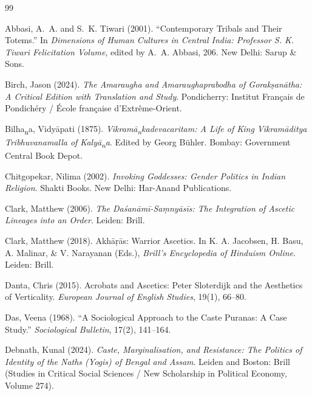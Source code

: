 \documentclass[11pt,twoside,letterpaper]{article}
\begin{document}
\begin{thebibliography}{99}

Abbasi, A.~A. and S.~K. Tiwari (2001). ``Contemporary Tribals and Their Totems.'' In \textit{Dimensions of Human Cultures in Central India: Professor S. K. Tiwari Felicitation Volume}, edited by A.~A. Abbasi, 206. New Delhi: Sarup \& Sons.

Birch, Jason (2024). \textit{The Amaraugha and Amaraughaprabodha of Gorakṣanātha: A Critical Edition with Translation and Study}. Pondicherry: Institut Français de Pondichéry / École française d'Extrême-Orient.

Bilha\textsubscript{n}a, Vidy\={a}pati (1875). \textit{Vikram\={a}\textsubscript{n}kadevacaritam: A Life of King Vikram\={a}ditya Tribhuvanamalla of Kaly\={a}\textsubscript{n}a}. Edited by Georg B\"{u}hler. Bombay: Government Central Book Depot.

Chitgopekar, Nilima (2002). \textit{Invoking Goddesses: Gender Politics in Indian Religion}. Shakti Books. New Delhi: Har-Anand Publications.

Clark, Matthew (2006). \textit{The Daśanāmī-Saṃnyāsīs: The Integration of Ascetic Lineages into an Order}. Leiden: Brill.

Clark, Matthew (2018). Akhāṛās: Warrior Ascetics. In K. A. Jacobsen, H. Basu, A. Malinar, \& V. Narayanan (Eds.), \textit{Brill’s Encyclopedia of Hinduism Online}. Leiden: Brill.

{}
Danta, Chris (2015). Acrobats and Ascetics: Peter Sloterdijk and the Aesthetics of Verticality. \textit{European Journal of English Studies}, 19(1), 66--80.

Das, Veena (1968). ``A Sociological Approach to the Caste Puranas: A Case Study.'' \textit{Sociological Bulletin}, 17(2), 141--164.

Debnath, Kunal (2024). \textit{Caste, Marginalisation, and Resistance: The Politics of Identity of the Naths (Yogis) of Bengal and Assam}. Leiden and Boston: Brill (Studies in Critical Social Sciences / New Scholarship in Political Economy, Volume 274).


\end{thebibliography}
\end{document}
